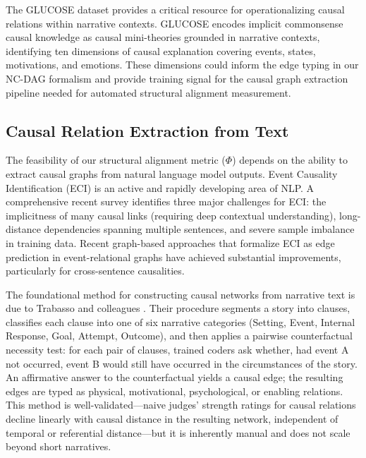 \documentclass[11pt,letterpaper]{article}
\theoremstyle{defn}
\begin{document}
The GLUCOSE dataset \citep{mostafazadeh2020} provides a critical resource for operationalizing causal relations within narrative contexts. GLUCOSE encodes implicit commonsense causal knowledge as causal mini-theories grounded in narrative contexts, identifying ten dimensions of causal explanation covering events, states, motivations, and emotions. These dimensions could inform the edge typing in our NC-DAG formalism and provide training signal for the causal graph extraction pipeline needed for automated structural alignment measurement.

\subsection{Causal Relation Extraction from Text}

The feasibility of our structural alignment metric ($\Phi$) depends on the ability to extract causal graphs from natural language model outputs. Event Causality Identification (ECI) is an active and rapidly developing area of NLP. A comprehensive recent survey identifies three major challenges for ECI: the implicitness of many causal links (requiring deep contextual understanding), long-distance dependencies spanning multiple sentences, and severe sample imbalance in training data. Recent graph-based approaches that formalize ECI as edge prediction in event-relational graphs have achieved substantial improvements, particularly for cross-sentence causalities.

The foundational method for constructing causal networks from narrative text is due to Trabasso and colleagues \citep{trabasso1985relatedness,trabasso1985causal,trabasso1989}. Their procedure segments a story into clauses, classifies each clause into one of six narrative categories (Setting, Event, Internal Response, Goal, Attempt, Outcome), and then applies a pairwise counterfactual necessity test: for each pair of clauses, trained coders ask whether, had event A not occurred, event B would still have occurred in the circumstances of the story. An affirmative answer to the counterfactual yields a causal edge; the resulting edges are typed as physical, motivational, psychological, or enabling relations. This method is well-validated---naive judges' strength ratings for causal relations decline linearly with causal distance in the resulting network, independent of temporal or referential distance---but it is inherently manual and does not scale beyond short narratives.
\end{document}
